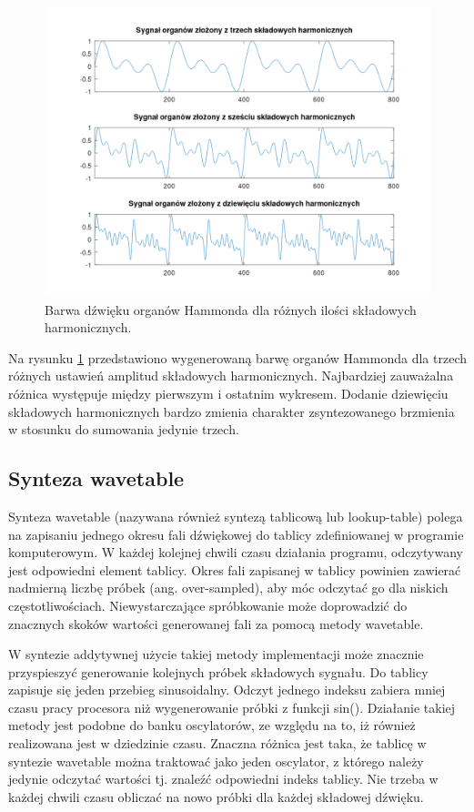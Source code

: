 \begin{figure}[H]
	\centering
	\includegraphics[width=15cm]{grafiki/add_hammond_matlab}
	\captionsetup{justification=centering}
	\caption{Barwa dźwięku organów Hammonda dla różnych ilości składowych harmonicznych.}
	\label{rys:add_hammond_matlab}
\end{figure}

Na rysunku \ref{rys:add_hammond_matlab} przedstawiono wygenerowaną barwę organów Hammonda dla trzech różnych ustawień amplitud składowych harmonicznych. Najbardziej zauważalna różnica występuje między pierwszym i ostatnim wykresem. Dodanie dziewięciu składowych harmonicznych bardzo zmienia charakter zsyntezowanego brzmienia w stosunku do sumowania jedynie trzech.


\subsection{Synteza wavetable} \label{add_wavetable}
Synteza wavetable (nazywana również syntezą tablicową lub lookup-table) polega na zapisaniu jednego okresu fali dźwiękowej do tablicy zdefiniowanej w programie komputerowym. W każdej kolejnej chwili czasu działania programu, odczytywany jest odpowiedni element tablicy. Okres fali zapisanej w tablicy powinien zawierać nadmierną liczbę próbek (ang. over-sampled), aby móc odczytać go dla niskich częstotliwościach. Niewystarczające spróbkowanie może doprowadzić do znacznych skoków wartości generowanej fali za pomocą metody wavetable.

W syntezie addytywnej użycie takiej metody implementacji może znacznie przyspieszyć generowanie kolejnych próbek składowych sygnału. Do tablicy zapisuje się jeden przebieg sinusoidalny. Odczyt jednego indeksu zabiera mniej czasu pracy procesora niż wygenerowanie próbki z funkcji sin(). Działanie takiej metody jest podobne do banku oscylatorów, ze względu na to, iż również realizowana jest w dziedzinie czasu. Znaczna różnica jest taka, że tablicę w syntezie wavetable można traktować jako jeden oscylator, z którego należy jedynie odczytać wartości tj. znaleźć odpowiedni indeks tablicy. Nie trzeba w każdej chwili czasu obliczać na nowo próbki dla każdej składowej dźwięku.

